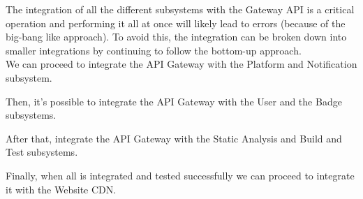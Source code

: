 The integration of all the different subsystems with the Gateway API is a critical operation and performing it all at once will likely lead to errors (because of the big-bang like approach).
To avoid this, the integration can be broken down into smaller integrations by continuing to follow the bottom-up approach.\\
We can proceed to integrate the API Gateway with the Platform and Notification subsystem.

\begin{adjustbox}{
        max size={\textwidth}{},
        center,
        caption={API Gateway subsystem step 1},
        label={fig:API Gateway subsystem step 1},
        figure=H}
\end{adjustbox}

Then, it's possible to integrate the API Gateway with the User and the Badge subsystems.


\begin{adjustbox}{
        max size={\textwidth}{},
        center,
        caption={API Gateway subsystem step 2},
        label={fig:API Gateway subsystem step 2},
        figure=H}
\end{adjustbox}

After that, integrate the API Gateway with the Static Analysis and Build and Test subsystems.

\begin{adjustbox}{
        max size={\textwidth}{},
        center,
        caption={API Gateway subsystem step 3},
        label={fig:API Gateway subsystem step 3},
        figure=H}
\end{adjustbox}

Finally, when all is integrated and tested successfully we can proceed to integrate it with the Website CDN.

\begin{adjustbox}{
        max size={\textwidth}{},
        center,
        caption={API Gateway subsystem step 4},
        label={fig:API Gateway subsystem step 4},
        figure=H}
\end{adjustbox}